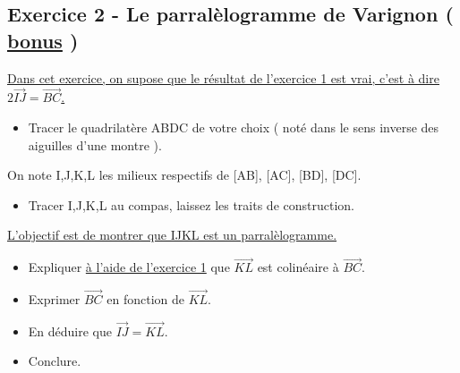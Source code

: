 \documentclass[french]{book}
\begin{document}
\subsection*{Exercice 2 - Le parralèlogramme de Varignon ( \underline{bonus} )}

\underline{Dans cet exercice, on supose que le résultat de l'exercice 1 est vrai, c'est à dire $2\overrightarrow{IJ}=\overrightarrow{BC}$.}\\


\begin{itemize}
\item[A)] Tracer le quadrilatère ABDC de votre choix ( noté dans le sens inverse des aiguilles d'une montre  ).\\
\end{itemize}
On note I,J,K,L les milieux respectifs de [AB], [AC], [BD], [DC].\\


\begin{itemize}
\item[B)] Tracer I,J,K,L au compas, laissez les traits de construction.\\

\end{itemize}

\underline{L'objectif est de montrer que IJKL est un parralèlogramme.}\\



\begin{itemize}
\item[C)] Expliquer \underline{à l'aide de l'exercice 1} que $\overrightarrow{KL}$ est colinéaire à  $\overrightarrow{BC}$. 
\item[D)] Exprimer $\overrightarrow{BC}$ en fonction de $\overrightarrow{KL}$.
\item[E)] En déduire que  $\overrightarrow{IJ}=\overrightarrow{KL}$.
\item[F)] Conclure.
\end{itemize}
\end{document}
